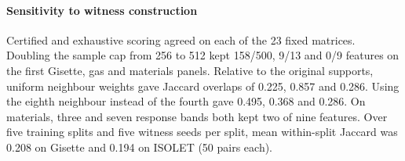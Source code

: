 \paragraph{Sensitivity to witness construction}
Certified and exhaustive scoring agreed on each of the 23 fixed matrices. Doubling the sample cap from 256 to 512 kept 158/500, 9/13 and 0/9 features on the first Gisette, gas and materials panels. Relative to the original supports, uniform neighbour weights gave Jaccard overlaps of 0.225, 0.857 and 0.286. Using the eighth neighbour instead of the fourth gave 0.495, 0.368 and 0.286. On materials, three and seven response bands both kept two of nine features. Over five training splits and five witness seeds per split, mean within-split Jaccard was 0.208 on Gisette and 0.194 on ISOLET (50 pairs each).

